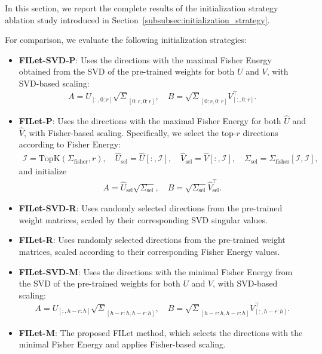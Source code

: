 \documentclass{article}
\theoremstyle{plain}
\theoremstyle{definition}
\theoremstyle{remark}
\begin{document}
In this section, we report the complete results of the initialization strategy ablation study introduced in Section~\ref{subsubsec:initialization_strategy}. 

For comparison, we evaluate the following initialization strategies:
\begin{itemize}
  \item \textbf{FILet-SVD-P}: Uses the directions with the maximal Fisher Energy obtained from the SVD of the pre-trained weights for both $U$ and $V$, with SVD-based scaling:
  \begin{align}
  A = U_{[:, 0:r]} \sqrt{\Sigma}_{[0:r, 0:r]}, \quad
  B = \sqrt{\Sigma}_{[0:r, 0:r]} V_{[:, 0:r]}^\top .
  \end{align}

  \item \textbf{FILet-P}: Uses the directions with the maximal Fisher Energy for both $\hat{U}$ and $\hat{V}$, with Fisher-based scaling. Specifically, we select the top-$r$ directions according to Fisher Energy:
  \begin{align}
  \mathcal{I} = \mathrm{TopK}(\Sigma_{\text{fisher}}, r), \quad
  \hat{U}_{\text{sel}} = \hat{U}[:, \mathcal{I}], \quad
  \hat{V}_{\text{sel}} = \hat{V}[:, \mathcal{I}], \quad
  \Sigma_{\text{sel}} = \Sigma_{\text{fisher}}[\mathcal{I}, \mathcal{I}],
  \end{align}
  and initialize
  \begin{align}
  A = \hat{U}_{\text{sel}} \sqrt{\Sigma_{\text{sel}}}, \quad
  B = \sqrt{\Sigma_{\text{sel}}} \hat{V}_{\text{sel}}^\top .
  \end{align}

  \item \textbf{FILet-SVD-R}: Uses randomly selected directions from the pre-trained weight matrices, scaled by their corresponding SVD singular values.

  \item \textbf{FILet-R}: Uses randomly selected directions from the pre-trained weight matrices, scaled according to their corresponding Fisher Energy values.

  \item \textbf{FILet-SVD-M}: Uses the directions with the minimal Fisher Energy from the SVD of the pre-trained weights for both $U$ and $V$, with SVD-based scaling:
  \begin{align}
  A = U_{[:, h-r:h]} \sqrt{\Sigma}_{[h-r:h, h-r:h]}, \quad
  B = \sqrt{\Sigma}_{[h-r:h, h-r:h]} V_{[:, h-r:h]}^\top .
  \end{align}

  \item \textbf{FILet-M}: The proposed FILet method, which selects the directions with the minimal Fisher Energy and applies Fisher-based scaling.
\end{itemize}
\end{document}
